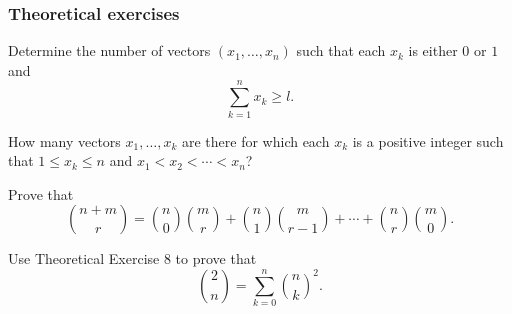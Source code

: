\subsubsection{Theoretical exercises}
\begin{problem}[Ross, \S 1, \# 5]
  Determine the number of vectors \((x_1,\dotsc,x_n)\) such that each
  \(x_k\) is either \(0\) or \(1\) and
  \[
    \sum_{k=1}^n x_k\geq l.
  \]
\end{problem}
\begin{solution*}
\end{solution*}

\begin{problem}[Ross, \S 1, \# 6]
  How many vectors \(x_1,\dotsc,x_k\) are there for which each \(x_k\) is a
  positive integer such that \(1\leq x_k\leq n\) and \(x_1<x_2<\dotsb<
  x_n\)?
\end{problem}
\begin{solution*}
\end{solution*}

\begin{problem}[Ross, \S 1, \# 8]
  Prove that
  \[
    \binom{n+m}{r}=%
    \binom{n}{0}\binom{m}{r}+\binom{n}{1}\binom{m}{r-1}%
    +\dotsb+\binom{n}{r}\binom{m}{0}.
  \]
\end{problem}
\begin{solution*}
\end{solution*}

\begin{problem}[Ross, \S 1, \# 9]
  Use Theoretical Exercise 8 to prove that
  \[
    \binom{2}{n}=\sum_{k=0}^n\binom{n}{k}^2.
  \]
\end{problem}
\begin{solution*}
\end{solution*}

